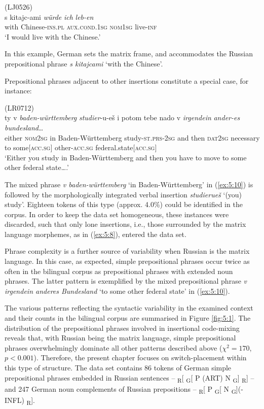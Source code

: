 \ea
\label{ex:5:9}
(LJ0526)\\
\gll s kitajc-ami \textit{würde} \textit{ich} \textit{leb-en}\\
	{with} Chinese-\textsc{ins.pl} \textsc{aux.cond.1sg} \textsc{nom1sg} live-\textsc{inf}\\
\glt `I would live with the Chinese.'
\z

\noindent
In this example, German sets the matrix frame, and accommodates the Russian prepositional phrase \textit{s kitajcami} `with the Chinese'. 

Prepositional phrases adjacent to other insertions constitute a special case, for instance:

\ea
\label{ex:5:10}
(LR0712)\\
 {ty} {v} \textit{baden-württemberg} \textit{studier}-{u-eš} {i} {potom} {tebe} {nado} {v} \textit{irgendein} \textit{ander-es} {\textit{bundesland}\dots{}}\\
	{either} \textsc{nom2sg} in Baden-Württemberg study-\textsc{st.prs-2sg} and then \textsc{dat2sg} necessary to some$[$\textsc{acc.sg}$]$ other-\textsc{acc.sg} federal.state$[$\textsc{acc.sg}$]$\\
\glt `Either you study in Baden-Württemberg and then you have to move to some other federal state\dots{}.'
\z

\noindent The mixed phrase \textit{v baden-württemberg} `in Baden-Württemberg' in (\ref{ex:5:10}) is followed by the morphologically integrated verbal insertion \textit{studierueš} `(you) study'. Eighteen tokens of this type (approx. 4.0\%) could be identified in the corpus. In order to keep the data set homogeneous, these instances were discarded, such that only lone insertions, i.e., those surrounded by the matrix language morphemes, as in (\ref{ex:5:8}), entered the data set.

Phrase complexity is a further source of variability  when Russian is the matrix language. In this case, as expected, simple prepositional phrases occur twice as often in the bilingual corpus as prepositional phrases with extended noun phrases. The latter pattern is exemplified by the mixed prepositional phrase \textit{v irgendein anderes Bundesland} `to some other federal state' in (\ref{ex:5:10}). 

The various patterns reflecting the syntactic variability in the examined context and their counts in the bilingual corpus are summarised in Figure \ref{fig:5:1}. The distribution of the prepositional phrases involved in insertional code-mixing reveals that, with Russian being the matrix language, simple prepositional phrases overwhelmingly dominate all other patterns described above ($\chi^2 = 170$, $p < 0.001$). Therefore, the present chapter focuses on switch-placement within this type of structure. The data set contains 86 tokens of German simple prepositional phrases embedded in Russian sentences -- \textsubscript{R}[ \textsubscript{G}[ P (ART) N \textsubscript{G}] \textsubscript{R}] -- and 247 German noun complements of Russian prepositions -- \textsubscript{R}[ P \textsubscript{G}[ N  \textsubscript{G}](-INFL) \textsubscript{R}].

